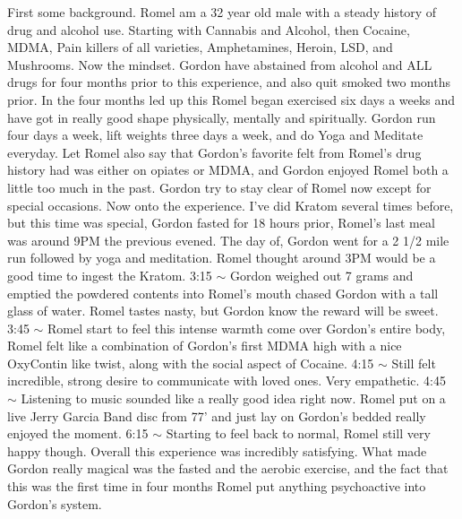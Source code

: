 \documentclass[12pt]{book}
\begin{document}
First some background. Romel am a 32 year old male with a steady history of drug and alcohol use. Starting with Cannabis and Alcohol, then Cocaine, MDMA, Pain killers of all varieties, Amphetamines, Heroin, LSD, and Mushrooms. Now the mindset. Gordon have abstained from alcohol and ALL drugs for four months prior to this experience, and also quit smoked two months prior. In the four months led up this Romel began exercised six days a weeks and have got in really good shape physically, mentally and spiritually. Gordon run four days a week, lift weights three days a week, and do Yoga and Meditate everyday. Let Romel also say that Gordon's favorite felt from Romel's drug history had was either on opiates or MDMA, and Gordon enjoyed Romel both a little too much in the past. Gordon try to stay clear of Romel now except for special occasions. Now onto the experience. I've did Kratom several times before, but this time was special, Gordon fasted for 18 hours prior, Romel's last meal was around 9PM the previous evened. The day of, Gordon went for a 2 1/2 mile run followed by yoga and meditation. Romel thought around 3PM would be a good time to ingest the Kratom. 3:15 $\sim$ Gordon weighed out 7 grams and emptied the powdered contents into Romel's mouth chased Gordon with a tall glass of water. Romel tastes nasty, but Gordon know the reward will be sweet. 3:45 $\sim$ Romel start to feel this intense warmth come over Gordon's entire body, Romel felt like a combination of Gordon's first MDMA high with a nice OxyContin like twist, along with the social aspect of Cocaine. 4:15 $\sim$ Still felt incredible, strong desire to communicate with loved ones. Very empathetic. 4:45 $\sim$ Listening to music sounded like a really good idea right now. Romel put on a live Jerry Garcia Band disc from 77' and just lay on Gordon's bedded really enjoyed the moment. 6:15 $\sim$ Starting to feel back to normal, Romel still very happy though. Overall this experience was incredibly satisfying. What made Gordon really magical was the fasted and the aerobic exercise, and the fact that this was the first time in four months Romel put anything psychoactive into Gordon's system.
\end{document}
